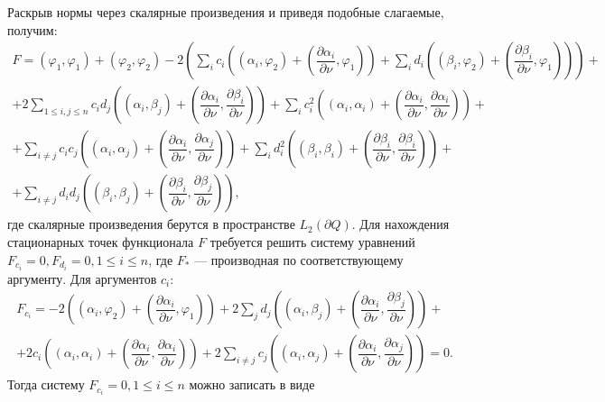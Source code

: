 \documentclass[a4paper]{article}
\begin{document}
Раскрыв нормы через скалярные произведения и приведя подобные слагаемые, получим:
\begin{multline}
  F=(\varphi_1,\varphi_1)+(\varphi_2,\varphi_2) - 2 \left(\sum_i c_i \left((\alpha_i,\varphi_2)+\left(\dfrac{\partial \alpha_i}{\partial \nu},\varphi_1\right)  \right)  + \sum_i d_i \left((\beta_i,\varphi_2)+\left(\dfrac{\partial \beta_i}{\partial \nu},\varphi_1\right)  \right) \right)+\\
  +2\sum_{1 \leq i,j \leq n} c_i d_j \left((\alpha_i,\beta_j)+\left(\dfrac{\partial \alpha_i}{\partial \nu},\dfrac{\partial \beta_i}{\partial \nu}\right)  \right)+
  \sum_i c_i^2 \left(  (\alpha_i,\alpha_i)+\left(\dfrac{\partial \alpha_i}{\partial \nu},\dfrac{\partial \alpha_i}{\partial \nu}\right)  \right)+\\
  +\sum_{i \ne j} c_i c_j \left(  (\alpha_i,\alpha_j)+\left(\dfrac{\partial \alpha_i}{\partial \nu},\dfrac{\partial \alpha_j}{\partial \nu}\right)\right)+
  \sum_i d_i^2 \left(  (\beta_i,\beta_i)+\left(\dfrac{\partial \beta_i}{\partial \nu},\dfrac{\partial \beta_i}{\partial \nu}\right)  \right)+\\
  +\sum_{i \ne j} d_i d_j \left(  (\beta_i,\beta_j)+\left(\dfrac{\partial \beta_i}{\partial \nu},\dfrac{\partial \beta_j}{\partial \nu}\right)\right),
\label{func}
\end{multline}
где скалярные произведения берутся в пространстве $L_2(\partial Q)$.
Для нахождения стационарных точек функционала $F$ требуется решить систему уравнений $F_{c_i}=0, F_{d_i}=0, 1\leq i \leq n$, где
$F_*$ --- производная по соответствующему аргументу. Для аргументов $c_i$:
\begin{multline}
  F_{c_i}=-2\left((\alpha_i,\varphi_2)+\left( \dfrac{\partial \alpha_i}{\partial \nu},\varphi_1 \right)\right)+ 2 \sum_j d_j \left((\alpha_i,\beta_j)+\left( \dfrac{\partial \alpha_i}{\partial \nu},\dfrac{\partial \beta_j}{\partial \nu} \right)\right)+\\
  +2 c_i \left((\alpha_i,\alpha_i)+\left( \dfrac{\partial \alpha_i}{\partial \nu},\dfrac{\partial \alpha_i}{\partial \nu} \right)\right)+2\sum_{i \ne j} c_j \left((\alpha_i,\alpha_j)+\left( \dfrac{\partial \alpha_i}{\partial \nu},\dfrac{\partial \alpha_j}{\partial \nu} \right)\right)=0.
\end{multline}  
Тогда систему $F_{c_i}=0,1\leq i \leq n$ можно записать в виде
\end{document}
